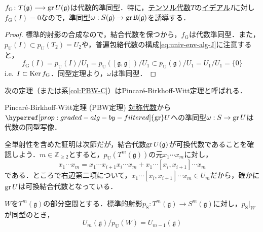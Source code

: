 \documentclass[rep_main]{subfiles}
\begin{document}
\begin{mylem}[label=lem:grU-alg]{}
	$f_\text{G} \colon T(\mathfrak{g}) \longrightarrow \operatorname{gr} U(\mathfrak{g})$は代数的準同型．特に，\hyperref[def:tensor-alg]{テンソル代数}$T$の\hyperref[eq:sym-alg-ideal]{イデアル$I$}に対し$f_\text{G}(I) = 0$なので，準同型$\omega: S(\mathfrak{g}) \to \operatorname{gr} \mathfrak{U}(\mathfrak{g})$を誘導する．
\end{mylem}
\begin{proof}
	標準的射影の合成なので，結合代数を保つから，$f_\text{G}$は代数準同型．また，$p_\text{U}(I) \subset p_\text{U}(T_2) = U_2$や，普遍包絡代数の構成\eqref{eq:univ-env-alg-J}に注意すると，
	\begin{equation}
		f_\text{G}(I) = p_\text{U}(I) / U_1 = p_\text{U}([\mathfrak{g}, \mathfrak{g}]) / U_1 \subset p_\text{U}(\mathfrak{g}) / U_1 = U_1 / U_1 = \{0\}
	\end{equation}
	i.e. $I \subset \operatorname{Ker} f_\text{G}$．同型定理より，$\omega$は準同型．
\end{proof}
次の定理（または系\ref{col:PBW-C}）はPincaré-Birkhoff-Witt定理と呼ばれる．
\begin{mytheo}[label=thm:PBW]{Pincaré-Birkhoff-Witt定理 (PBW定理)}
	\hyperref[def:sym-alg]{対称代数}から$\hyperref[prop:graded-alg-by-filtered]{\gr}U$への準同型$\omega: S \to \operatorname{gr} U$は代数の同型写像．
\end{mytheo}
全単射性を含めた証明は次節だが，結合代数$\operatorname{gr} U(\mathfrak{g})$が可換代数であることを確認しよう．$m \in \mathbb{Z}_{\geq 2}$とすると，$p_\text{U}(T^m(\mathfrak{g}))$の元$x_1 \cdots x_m$に対し，
\begin{equation}
	x_1 \cdots x_m = x_1 \cdots x_{i+1}x_i \cdots x_m + x_1 \cdots [x_i,x_{i+1}] \cdots x_m
\end{equation}
である．ところで右辺第二項について，$x_1 \cdots [x_i,x_{i+1}] \cdots x_m \in U_m$だから，確かに$\operatorname{gr} U$は可換結合代数となっている．
\begin{mycol}[label=col:PBW-A]{}
	$W$を$T^m(\mathfrak{g})$の部分空間とする．標準的射影$p_{\text{S}}: T^m(\mathfrak{g}) \to S^m(\mathfrak{g})$に対し，$p_{\text{S}}|_{W}$が同型のとき，\\
	\begin{equation}
		U_m(\mathfrak{g}) / p_{\text{U}}(W) = U_{m-1}(\mathfrak{g})
	\end{equation}
\end{mycol}
\end{document}
